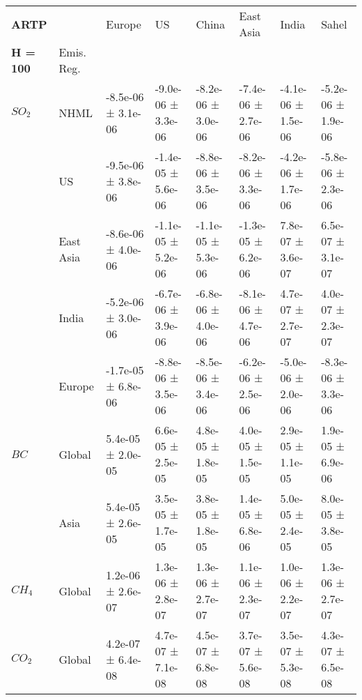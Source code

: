 \documentclass[preview]{standalone}
\newcommand{\nm}{\phantom{-}}
\begin{document}
	\tiny
	\begin{minipage}{\textwidth}
		\setlength\tabcolsep{5pt}
		\begin{tabular}{llllllll}
			\toprule
			\textbf{ARTP}        &        &               Europe &                   US &                China &            East Asia &                India &                Sahel \\
			\textbf{H = 100}   & Emis. Reg. &                      &                      &                      &                      &                      &                      \\
			\midrule
$SO_2$ & NHML &  -8.5e-06 ±  3.1e-06 &  -9.0e-06 ±  3.3e-06 &  -8.2e-06 ±  3.0e-06 &  -7.4e-06 ±  2.7e-06 &  -4.1e-06 ±  1.5e-06 &  -5.2e-06 ±  1.9e-06 \\
       & US &  -9.5e-06 ±  3.8e-06 &  -1.4e-05 ±  5.6e-06 &  -8.8e-06 ±  3.5e-06 &  -8.2e-06 ±  3.3e-06 &  -4.2e-06 ±  1.7e-06 &  -5.8e-06 ±  2.3e-06 \\
       & East Asia &  -8.6e-06 ±  4.0e-06 &  -1.1e-05 ±  5.2e-06 &  -1.1e-05 ±  5.3e-06 &  -1.3e-05 ±  6.2e-06 &   \nm7.8e-07 ±  3.6e-07 &   \nm6.5e-07 ±  3.1e-07 \\
       & India &  -5.2e-06 ±  3.0e-06 &  -6.7e-06 ±  3.9e-06 &  -6.8e-06 ±  4.0e-06 &  -8.1e-06 ±  4.7e-06 &   \nm4.7e-07 ±  2.7e-07 &   \nm4.0e-07 ±  2.3e-07 \\
       & Europe &  -1.7e-05 ±  6.8e-06 &  -8.8e-06 ±  3.5e-06 &  -8.5e-06 ±  3.4e-06 &  -6.2e-06 ±  2.5e-06 &  -5.0e-06 ±  2.0e-06 &  -8.3e-06 ±  3.3e-06 \\
\cmidrule(lr){1-8}
$BC$ & Global &   \nm5.4e-05 ±  2.0e-05 &   \nm6.6e-05 ±  2.5e-05 &   \nm4.8e-05 ±  1.8e-05 &   \nm4.0e-05 ±  1.5e-05 &   \nm2.9e-05 ±  1.1e-05 &   \nm1.9e-05 ±  6.9e-06 \\
       & Asia &   \nm5.4e-05 ±  2.6e-05 &   \nm3.5e-05 ±  1.7e-05 &   \nm3.8e-05 ±  1.8e-05 &   \nm1.4e-05 ±  6.8e-06 &   \nm5.0e-05 ±  2.4e-05 &   \nm8.0e-05 ±  3.8e-05 \\
\cmidrule(lr){1-8}
$CH_4$ & Global &   \nm1.2e-06 ±  2.6e-07 &   \nm1.3e-06 ±  2.8e-07 &   \nm1.3e-06 ±  2.7e-07 &   \nm1.1e-06 ±  2.3e-07 &   \nm1.0e-06 ±  2.2e-07 &   \nm1.3e-06 ±  2.7e-07 \\
\cmidrule(lr){1-8}
$CO_2$ & Global &   \nm4.2e-07 ±  6.4e-08 &   \nm4.7e-07 ±  7.1e-08 &   \nm4.5e-07 ±  6.8e-08 &   \nm3.7e-07 ±  5.6e-08 &   \nm3.5e-07 ±  5.3e-08 &   \nm4.3e-07 ±  6.5e-08 \\
\bottomrule
\end{tabular}

        \end{minipage}
        
\end{document}
